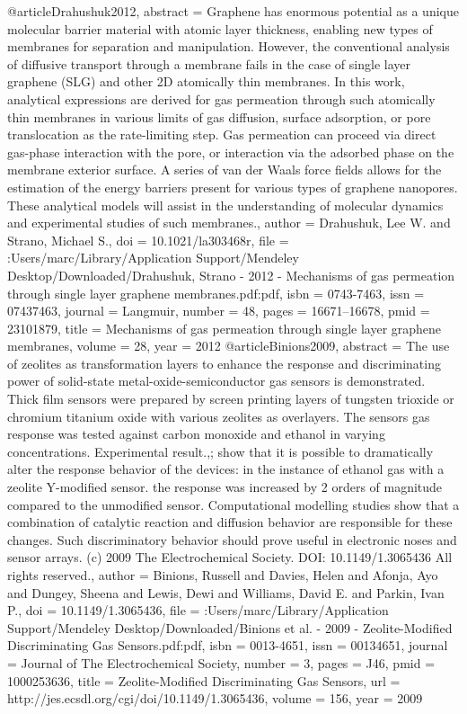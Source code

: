 @article{Drahushuk2012,
abstract = {Graphene has enormous potential as a unique molecular barrier material with atomic layer thickness, enabling new types of membranes for separation and manipulation. However, the conventional analysis of diffusive transport through a membrane fails in the case of single layer graphene (SLG) and other 2D atomically thin membranes. In this work, analytical expressions are derived for gas permeation through such atomically thin membranes in various limits of gas diffusion, surface adsorption, or pore translocation as the rate-limiting step. Gas permeation can proceed via direct gas-phase interaction with the pore, or interaction via the adsorbed phase on the membrane exterior surface. A series of van der Waals force fields allows for the estimation of the energy barriers present for various types of graphene nanopores. These analytical models will assist in the understanding of molecular dynamics and experimental studies of such membranes.},
author = {Drahushuk, Lee W. and Strano, Michael S.},
doi = {10.1021/la303468r},
file = {:Users/marc/Library/Application Support/Mendeley Desktop/Downloaded/Drahushuk, Strano - 2012 - Mechanisms of gas permeation through single layer graphene membranes.pdf:pdf},
isbn = {0743-7463},
issn = {07437463},
journal = {Langmuir},
number = {48},
pages = {16671--16678},
pmid = {23101879},
title = {{Mechanisms of gas permeation through single layer graphene membranes}},
volume = {28},
year = {2012}
}
@article{Binions2009,
abstract = {The use of zeolites as transformation layers to enhance the response and discriminating power of solid-state metal-oxide-semiconductor gas sensors is demonstrated. Thick film sensors were prepared by screen printing layers of tungsten trioxide or chromium titanium oxide with various zeolites as overlayers. The sensors gas response was tested against carbon monoxide and ethanol in varying concentrations. Experimental result.,; show that it is possible to dramatically alter the response behavior of the devices: in the instance of ethanol gas with a zeolite Y-modified sensor. the response was increased by 2 orders of magnitude compared to the unmodified sensor. Computational modelling studies show that a combination of catalytic reaction and diffusion behavior are responsible for these changes. Such discriminatory behavior should prove useful in electronic noses and sensor arrays. (c) 2009 The Electrochemical Society. DOI: 10.1149/1.3065436 All rights reserved.},
author = {Binions, Russell and Davies, Helen and Afonja, Ayo and Dungey, Sheena and Lewis, Dewi and Williams, David E. and Parkin, Ivan P.},
doi = {10.1149/1.3065436},
file = {:Users/marc/Library/Application Support/Mendeley Desktop/Downloaded/Binions et al. - 2009 - Zeolite-Modified Discriminating Gas Sensors.pdf:pdf},
isbn = {0013-4651},
issn = {00134651},
journal = {Journal of The Electrochemical Society},
number = {3},
pages = {J46},
pmid = {1000253636},
title = {{Zeolite-Modified Discriminating Gas Sensors}},
url = {http://jes.ecsdl.org/cgi/doi/10.1149/1.3065436},
volume = {156},
year = {2009}
}
